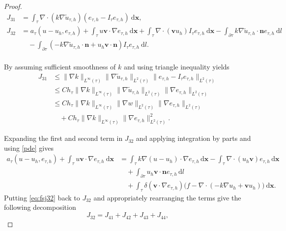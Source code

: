 \documentclass[times]{nlaauth}
\numberwithin{equation}{section}
\begin{document}
\begin{proof}
\begin{equation*}
\begin{aligned}
J_{31} & = \int_\tau  \nabla \cdot ( k \nabla \widetilde u_{\tau, h})  ( e_{\tau, h} - I_\tau e_{\tau, h} )  \ \text{d} \boldsymbol{x},  \\
J_{32} & =  a_\tau(u-u_h, e_{\tau, h}) 
+ \int_\tau  u\boldsymbol{v} \cdot \nabla e_{\tau, h} \ \text{d} \boldsymbol{x}
+  \int_\tau \nabla \cdot ( \boldsymbol{v} u_h ) I_\tau e_{\tau, h} \ \text{d} \boldsymbol{x} - \int_{\partial\tau} k\nabla \widetilde u_{\tau, h} \cdot \boldsymbol{n} e_{\tau, h} \ \text{d} l \\
& \quad  - \int_{\partial \tau} ( - k \nabla \widetilde u_{\tau, h} \cdot \boldsymbol{n} + u_h \boldsymbol{v} \cdot \boldsymbol{n} ) I_\tau e_{\tau, h} \ \text{d} l. \\
\end{aligned}
\end{equation*}

\noindent
By assuming sufficient smoothness of $k$ and using triangle inequality yields
\begin{equation} \label{eq:pJ31}
\begin{aligned}
J_{31} & \leq \| \nabla k \|_{L^\infty(\tau)}  \| \nabla \widetilde u_{\tau, h} \|_{L^2{(\tau)}}  \| e_{\tau,h} - I_\tau e_{\tau,h} \|_{L^2{(\tau)}}  \\
& \leq Ch_\tau \| \nabla k \|_{L^\infty(\tau)}  \| \nabla \widetilde u_{\tau, h} \|_{L^2{(\tau)}}  \| \nabla e_{\tau, h} \|_{L^2{(\tau)}}  \\
& \leq Ch_\tau \| \nabla k \|_{L^\infty(\tau)}  \| \nabla w \|_{L^2{(\tau)}}  \| \nabla e_{\tau, h} \|_{L^2{(\tau)}} \\
& \quad + Ch_\tau \| \nabla k \|_{L^\infty(\tau)}  \| \nabla e_{\tau, h} \|^2_{L^2{(\tau)}}.
\end{aligned}
\end{equation}

\noindent
Expanding the first and second term in $J_{32}$ and applying integration by parts
and using \eqref{pde} gives
\begin{equation} \label{eq:fsj32}
\begin{aligned}
a_\tau(u-u_h, e_{\tau, h}) 
+ \int_\tau  u\boldsymbol{v} \cdot \nabla e_{\tau, h} \ \text{d} \boldsymbol{x}
&= \int_\tau k \nabla(u-u_h) \cdot \nabla e_{\tau,h} \, \text{d} \boldsymbol{x}
- \int_\tau \nabla \cdot (u_h \boldsymbol{v}) e_{\tau,h} \, \text{d} \boldsymbol{x}\\
&\quad+ \int_{\partial \tau} u_h \boldsymbol{v} \cdot \boldsymbol{n} e_{\tau,h} \, \text{d} l\\
&\quad+ \int_\tau \delta ( \boldsymbol{v}  \cdot \nabla e_{\tau, h}) \big( f - \nabla \cdot ( -k\nabla u_h + \boldsymbol{v} u_h ) \big)   \ \text{d} \boldsymbol{x}.
\end{aligned}
\end{equation}
Putting \eqref{eq:fsj32} back to $J_{32}$ and appropriately rearranging the terms give the following decomposition
\begin{equation*}
J_{32} =  J_{41} + J_{42} + J_{43} + J_{44},
\end{equation*}


\end{proof}
\end{document}
